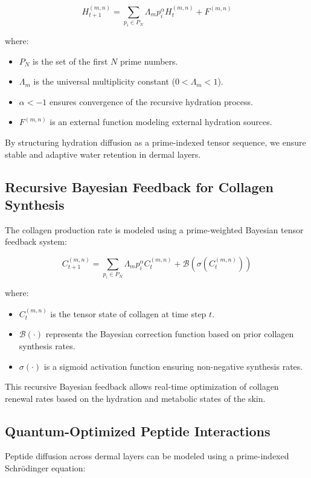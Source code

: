 \documentclass{article}
\theoremstyle{plain}
\theoremstyle{claimstyle}
\begin{document}
\begin{equation}
H_{t+1}^{(m,n)} = \sum_{p_i \in P_N} \Lambda_m p_i^{\alpha} H_t^{(m,n)} + F^{(m,n)}
\end{equation}

where:
\begin{itemize}
    \item $P_N$ is the set of the first $N$ prime numbers.
    \item $\Lambda_m$ is the universal multiplicity constant ($0 < \Lambda_m < 1$).
    \item $\alpha < -1$ ensures convergence of the recursive hydration process.
    \item $F^{(m,n)}$ is an external function modeling external hydration sources.
\end{itemize}

By structuring hydration diffusion as a prime-indexed tensor sequence, we ensure stable and adaptive water retention in dermal layers.

\subsection{Recursive Bayesian Feedback for Collagen Synthesis}
The collagen production rate is modeled using a prime-weighted Bayesian tensor feedback system:

\begin{equation}
C_{t+1}^{(m,n)} = \sum_{p_i \in P_N} \Lambda_m p_i^{\alpha} C_t^{(m,n)} + \mathcal{B} \left( \sigma(C_t^{(m,n)}) \right)
\end{equation}

where:
\begin{itemize}
    \item $C_t^{(m,n)}$ is the tensor state of collagen at time step $t$.
    \item $\mathcal{B}(\cdot)$ represents the Bayesian correction function based on prior collagen synthesis rates.
    \item $\sigma(\cdot)$ is a sigmoid activation function ensuring non-negative synthesis rates.
\end{itemize}

This recursive Bayesian feedback allows real-time optimization of collagen renewal rates based on the hydration and metabolic states of the skin.

\subsection{Quantum-Optimized Peptide Interactions}
Peptide diffusion across dermal layers can be modeled using a prime-indexed Schrödinger equation:
\end{document}
